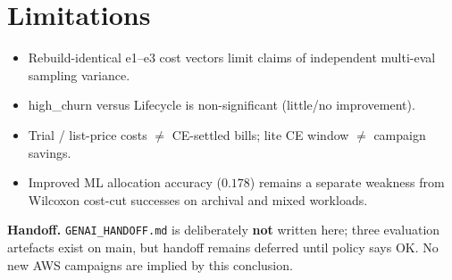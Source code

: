 \section{Limitations}

\begin{itemize}
    \item Rebuild-identical e1--e3 cost vectors limit claims of independent multi-eval
          sampling variance.
    \item high\_churn versus Lifecycle is non-significant (little/no improvement).
    \item Trial / list-price costs $\neq$ CE-settled bills; lite CE window $\neq$ campaign savings.
    \item Improved ML allocation accuracy ($0.178$) remains a separate weakness from Wilcoxon
          cost-cut successes on archival and mixed workloads.
\end{itemize}

\textbf{Handoff.} \texttt{GENAI\_HANDOFF.md} is deliberately \textbf{not} written here;
three evaluation artefacts exist on main, but handoff remains deferred until policy says OK.
No new AWS campaigns are implied by this conclusion.

